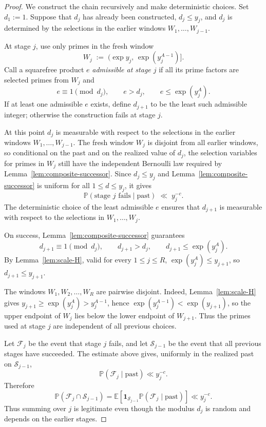 \documentclass[11pt,reqno]{amsart}
\theoremstyle{plain}
\theoremstyle{definition}
\newcommand{\PP}{\mathbb{P}}
\newcommand{\EE}{\mathbb{E}}
\begin{document}
\begin{proof}
We construct the chain recursively and make deterministic choices. Set
$d_1:=1$. Suppose that $d_j$ has already been constructed, $d_j\le y_j$, and
$d_j$ is determined by the selections in the earlier windows $W_1,\dots,W_{j-1}$.

At stage $j$, use only primes in the fresh window
\begin{equation}\label{eq:windowj}
W_j \;:=\; \bigl(\exp y_j,\,\exp(y_j^{A-1})\bigr].
\end{equation}
Call a squarefree product $e$ \emph{admissible at stage $j$} if all its prime
factors are selected primes from $W_j$ and
\[
e\equiv 1\!\pmod{d_j},\qquad e>d_j,\qquad e\le \exp(y_j^A).
\]
If at least one admissible $e$ exists, define $d_{j+1}$ to be the least such
admissible integer; otherwise the construction fails at stage $j$.

At this point $d_j$ is measurable with respect to the selections in the earlier
windows $W_1,\dots,W_{j-1}$. The fresh window $W_j$ is disjoint from all earlier
windows, so conditional on the past and on the realized value of $d_j$, the
selection variables for primes in $W_j$ still have the independent Bernoulli
law required by Lemma~\ref{lem:composite-successor}. Since $d_j\le y_j$ and
Lemma~\ref{lem:composite-successor} is uniform for all $1\le d\le y_j$, it gives
\[
\PP(\text{stage $j$ fails}\mid\text{past})\;\ll\; y_j^{-c}.
\]
The deterministic choice of the least admissible $e$ ensures that $d_{j+1}$ is
measurable with respect to the selections in $W_1,\dots,W_j$.

On success, Lemma~\ref{lem:composite-successor} guarantees
\[
d_{j+1}\equiv 1\!\pmod{d_j},\qquad d_{j+1}>d_j,\qquad d_{j+1}\le\exp(y_j^A).
\]
By Lemma~\ref{lem:scale-H}, valid for every $1\le j\le R$,
$\exp(y_j^A)\le y_{j+1}$, so $d_{j+1}\le y_{j+1}$.

The windows $W_1,W_2,\dots,W_R$ are pairwise disjoint. Indeed,
Lemma~\ref{lem:scale-H} gives $y_{j+1}\ge\exp(y_j^A)>y_j^{A-1}$, hence
$\exp(y_j^{A-1})<\exp(y_{j+1})$, so the upper endpoint of $W_j$ lies below
the lower endpoint of $W_{j+1}$. Thus the primes used at stage $j$ are
independent of all previous choices.

Let $\mathcal F_j$ be the event that stage $j$ fails, and let
$\mathcal S_{j-1}$ be the event that all previous stages have succeeded.
The estimate above gives, uniformly in the realized past on $\mathcal S_{j-1}$,
\[
   \PP(\mathcal F_j\mid \text{past}) \ll y_j^{-c}.
\]
Therefore
\[
\PP(\mathcal F_j\cap \mathcal S_{j-1})
=
\EE\!\left[
   \mathbf 1_{\mathcal S_{j-1}}
   \PP(\mathcal F_j\mid \text{past})
\right]
\ll y_j^{-c}.
\]
Thus summing over $j$ is legitimate even though the modulus $d_j$ is random and
depends on the earlier stages.


\end{proof}
\end{document}

